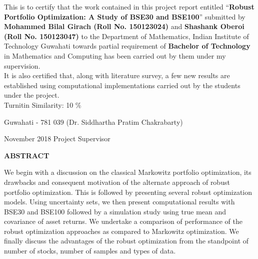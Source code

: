 \documentclass[12pt,a4paper]{report}
\theoremstyle{plain}
\theoremstyle{definition}
\theoremstyle{remark}
\begin{document}
\noindent
This is to certify that the work contained in this project report entitled 
“\textbf{Robust Portfolio Optimization: A Study of BSE30 and BSE100}” submitted by \textbf{Mohammed Bilal Girach (Roll No. 150123024)} and \textbf{Shashank Oberoi (Roll No. 150123047)} 
to the Department of Mathematics, Indian Institute of Technology Guwahati towards partial requirement of
\textbf{Bachelor of Technology} in Mathematics and Computing has been carried out by them under
my supervision. \\

\noindent
It is also certified that, along with literature survey, a few new results are established using computational implementations carried out by the students under the project.\\

\noindent
Turnitin Similarity: 10 \%
%

\vspace{4cm}

\noindent Guwahati - 781 039 \hfill (Dr. Siddhartha Pratim Chakrabarty)

\noindent November 2018 \hfill Project Supervisor

\clearpage

\begin{center}
{\Large{\bf{ABSTRACT}}}
\end{center}


We begin with a discussion on the classical Markowitz portfolio optimization, its drawbacks and consequent motivation of the alternate approach of robust portfolio optimization. This is followed by presenting several robust optimization models. Using uncertainty sets, we then present computational results with BSE30 and BSE100 followed by a simulation study using true mean and covariance of asset returns. We undertake a comparison of performance of the robust optimization approaches as compared to Markowitz optimization. We finally discuss the advantages of the robust optimization from the standpoint of number of stocks, number of samples and types of data.

\clearpage



\tableofcontents
\clearpage
\listoffigures
\listoftables


\newpage

\setcounter{page}{1}










\end{document}
